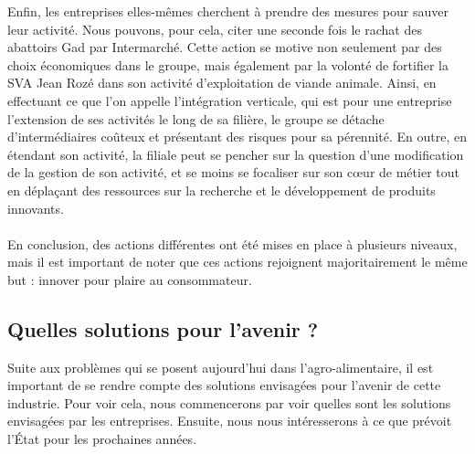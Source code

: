 \documentclass[a4paper,12pt]{report}
\begin{document}
			Enfin, les entreprises elles-mêmes cherchent à prendre des mesures pour sauver leur activité. Nous pouvons, pour cela, citer une seconde fois le rachat des abattoirs Gad par Intermarché. Cette action se motive non seulement par des choix économiques dans le groupe, mais également par la volonté de fortifier la SVA Jean Rozé dans son activité d’exploitation de viande animale. Ainsi, en effectuant ce que l’on appelle l’intégration verticale, qui est pour une entreprise l’extension de ses activités le long de sa filière, le groupe se détache d’intermédiaires coûteux et présentant des risques pour sa pérennité. En outre, en étendant son activité, la filiale peut se pencher sur la question d’une modification de la gestion de son activité, et se moins se focaliser sur son cœur de métier tout en déplaçant des ressources sur la recherche et le développement de produits innovants.

			\paragraph{}En conclusion, des actions différentes ont été mises en place à plusieurs niveaux, mais il est important de noter que ces actions rejoignent majoritairement le même but : innover pour plaire au consommateur.

			
		\subsection{Quelles solutions pour l'avenir ?}
			Suite aux problèmes qui se posent aujourd'hui dans l’agro-alimentaire, il est important de se rendre compte des solutions envisagées pour l’avenir de cette industrie. Pour voir cela, nous commencerons par voir quelles sont les solutions envisagées par les entreprises. Ensuite, nous nous intéresserons à ce que prévoit l’État pour les prochaines années.
			
\end{document}
